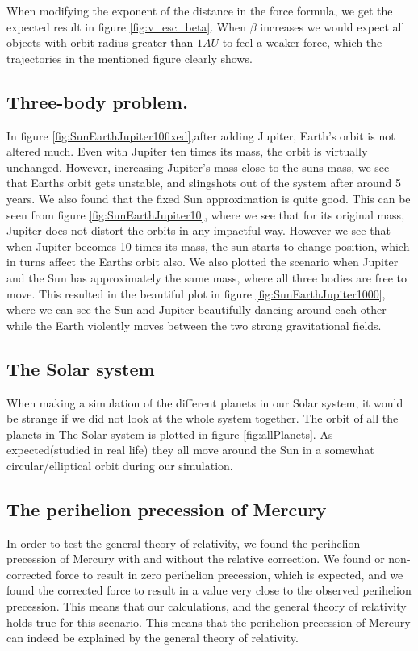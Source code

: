 \documentclass[../main.tex]{subfiles}
\begin{document}
When modifying the exponent of the distance in the force formula, we get the expected result in figure \ref{fig:v_esc_beta}. When $\beta$ increases we would expect all objects with orbit radius greater than $1AU$ to feel a weaker force, which the trajectories in the mentioned figure clearly shows.

\subsection{Three-body problem.}
In figure \ref{fig:SunEarthJupiter10fixed},after adding Jupiter, Earth's orbit is not altered much. Even with Jupiter ten times its mass, the orbit is virtually unchanged. However, increasing Jupiter's mass close to the suns mass, we see that Earths orbit gets unstable, and slingshots out of the system after around 5 years.
We also found that the fixed Sun approximation is quite good. This can be seen from figure \ref{fig:SunEarthJupiter10}, where we see that for its original mass, Jupiter does not distort the orbits in any impactful way. However we see that when Jupiter becomes 10 times its mass, the sun starts to change position, which in turns affect the Earths orbit also. We also plotted the scenario when Jupiter and the Sun has approximately the same mass, where all three bodies are free to move. This resulted in the beautiful plot in figure \ref{fig:SunEarthJupiter1000}, where we can see the Sun and Jupiter beautifully dancing around each other while the Earth violently moves between the two strong gravitational fields.

\subsection{The Solar system}
When making a simulation of the different planets in our Solar system, it would be strange if we did not look at the whole system together. The orbit of all the planets in The Solar system is plotted in figure \ref{fig:allPlanets}. As expected(studied in real life) they all move around the Sun in a somewhat circular/elliptical orbit during our simulation.

\subsection{The perihelion precession of Mercury}
In order to test the general theory of relativity, we found the perihelion precession of Mercury with and without the relative correction. We found or non-corrected force to result in zero perihelion precession, which is expected, and we found the corrected force to result in a value very close to the observed perihelion precession. This means that our calculations, and the general theory of relativity holds true for this scenario.
This means that the perihelion precession of Mercury can indeed be explained by the general theory of relativity.
\end{document}
